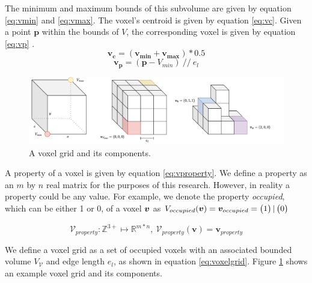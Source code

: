 The minimum and maximum bounds of this subvolume are given by equation \ref{eq:vmin} and \ref{eq:vmax}. The voxel's centroid is given by equation \ref{eq:vc}. Given a point \(\boldsymbol{p}\) within the bounds of \(V\), the corresponding voxel is given by equation \ref{eq:vp} . 
\begin{equation}
    \label{eq:vc}
    \boldsymbol{v_c} = (\boldsymbol{v_{min}} + \boldsymbol{v_{max}})*0.5
\end{equation}
\begin{equation}
    \label{eq:vp}
    \boldsymbol{v_p} = (\boldsymbol{p} - V_{min})\ //\ e_l
\end{equation}


\begin{figure}[h]
    \centering
    \includegraphics*[width=\textwidth]{./fig/voxel_basics.pdf}
    \caption{A voxel grid and its components.}
    \label{fig:vg_basic}
\end{figure}

A property of a voxel is given by equation \ref{eq:vproperty}. We define a property as an \(m\) by \(n\) real matrix for the purposes of this research. However, in reality a property could be any value. For example, we denote the property \textit{occupied}, which can be either 1 or 0, of a voxel \(\boldsymbol{v}\) as \(V_{occupied}(\boldsymbol{v}) = \boldsymbol{v}_{occupied} = \begin{pmatrix} 1 \end{pmatrix} | \begin{pmatrix} 0 \end{pmatrix}\)

\begin{equation}
    \label{eq:vproperty}
    \mathcal{V}_{property}: \mathbb{Z}^{3+} \mapsto \mathbb{R}^{m*n},\ \mathcal{V}_{property}(\boldsymbol{v}) = \boldsymbol{v}_{property}
\end{equation}

We define a voxel grid as a set of occupied voxels with an associated bounded volume \(V_{\mathcal{V}}\) and edge length \(e_{l}\), as shown in equation \ref{eq:voxelgrid}. Figure \ref{fig:vg_basic} shows an example voxel grid and its components.

